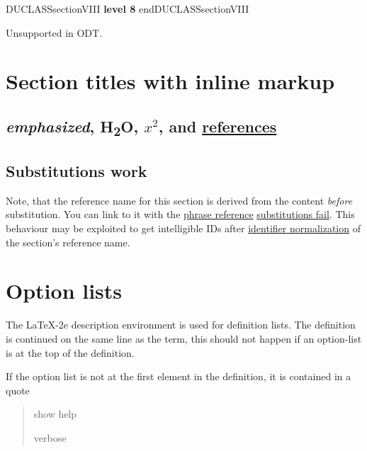 \documentclass[a4paper]{article}
\newenvironment{DUclass}[1]%
    {%
     \def\DocutilsClassFunctionName{DUCLASS#1}
     \csname \DocutilsClassFunctionName \endcsname}%
    {\csname end\DocutilsClassFunctionName \endcsname}%
\providecommand*{\DUoptionlistlabel}[1]{\bfseries #1 \hfill}
\newenvironment{DUoptionlist}{%
    \list{}{\setlength{\labelwidth}{\DUoptionlistindent}
            \setlength{\rightmargin}{1cm}
            \setlength{\leftmargin}{\rightmargin}
            \addtolength{\leftmargin}{\labelwidth}
            \addtolength{\leftmargin}{\labelsep}
            \renewcommand{\makelabel}{\DUoptionlistlabel}}
  }
  {\endlist}
\providecommand*{\DUtitle}[1]{%
  \smallskip\noindent\textbf{#1}\smallskip}
\begin{document}
\begin{DUclass}{sectionVIII}
\DUtitle{level 8}
\end{DUclass}

Unsupported in ODT.


\section{Section titles with inline markup}


\subsection{\emph{emphasized}, H\textsubscript{2}O, $x^2$, and \hyperref[references]{references}}


\subsection{Substitutions work%
  \label{substitutions-fail}%
}

\label{references}
Note, that the \textquotedbl{}reference name\textquotedbl{} for this section is derived from the
content \emph{before} substitution. You can link to it with the \href{https://docutils.sourceforge.io/docs/ref/rst/restructuredtext.html\#hyperlink-references}{phrase
reference} \textquotedbl{}\hyperref[substitutions-fail]{substitutions fail}\textquotedbl{}.
This behaviour may be exploited to get intelligible IDs after \href{https://docutils.sourceforge.io/docs/ref/rst/directives.html\#identifier-normalization}{identifier
normalization} of the section's reference name.



\section{Option lists}

The LaTeX-2e description environment is used for definition lists.
The definition is continued on the same line as the term, this should
not happen if an option-list is at the top of the definition.

If the option list is not at the first element in the definition, it
is contained in a quote

\begin{quote}
\begin{DUoptionlist}
\item[-{}-help]  show help
\item[-v]  verbose
\end{DUoptionlist}
\end{quote}
\end{document}
